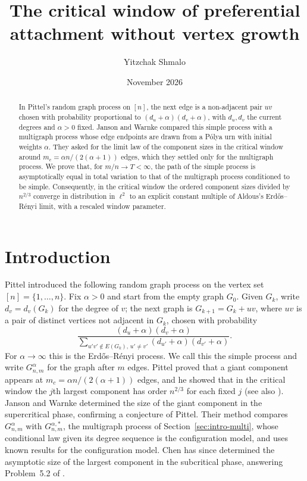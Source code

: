\documentclass[11pt]{amsart}
\title[Preferential attachment without vertex growth]{The critical window of preferential attachment without vertex growth}
\author{Yitzchak Shmalo}
\date{November 2026}
\theoremstyle{remark}
\numberwithin{equation}{section}
\begin{document}
\begin{abstract}
In Pittel's random graph process on $[n]$, the next edge is a non-adjacent pair $uv$ chosen with probability proportional to $(d_u+\alpha)(d_v+\alpha)$, with $d_u,d_v$ the current degrees and $\alpha>0$ fixed. Janson and Warnke compared this simple process with a multigraph process whose edge endpoints are drawn from a P\'olya urn with initial weights $\alpha$. They asked for the limit law of the component sizes in the critical window around $m_c=\alpha n/(2(\alpha+1))$ edges, which they settled only for the multigraph process. We prove that, for $m/n\to T<\infty$, the path of the simple process is asymptotically equal in total variation to that of the multigraph process conditioned to be simple. Consequently, in the critical window the ordered component sizes divided by $n^{2/3}$ converge in distribution in $\ell^2$ to an explicit constant multiple of Aldous's Erd\H{o}s--R\'enyi limit, with a rescaled window parameter.
\end{abstract}
\maketitle

\section{Introduction}\label{sec:intro}

Pittel \cite{Pi10} introduced the following random graph process on the vertex set $[n]=\{1,\dots,n\}$. Fix $\alpha>0$ and start from the empty graph $G_0$. Given $G_k$, write $d_v=d_v(G_k)$ for the degree of $v$; the next graph is $G_{k+1}=G_k+uv$, where $uv$ is a pair of distinct vertices not adjacent in $G_k$, chosen with probability
\begin{equation}\label{eq:simple}
\frac{(d_u+\alpha)(d_v+\alpha)}{\sum_{u'v'\notin E(G_k),\,u'\ne v'}(d_{u'}+\alpha)(d_{v'}+\alpha)}.
\end{equation}
For $\alpha\to\infty$ this is the Erd\H{o}s--R\'enyi process. We call this the simple process and write $G^{\alpha}_{n,m}$ for the graph after $m$ edges. Pittel proved that a giant component appears at $m_c=\alpha n/(2(\alpha+1))$ edges, and he showed that in the critical window the $j$th largest component has order $n^{2/3}$ for each fixed $j$ \cite{Pi10} (see also \cite[Problem~5.3]{JW21}). Janson and Warnke \cite{JW21} determined the size of the giant component in the supercritical phase, confirming a conjecture of Pittel. Their method compares $G^\alpha_{n,m}$ with $G^{\alpha,*}_{n,m}$, the multigraph process of Section~\ref{sec:intro-multi}, whose conditional law given its degree sequence is the configuration model, and uses known results for the configuration model. Chen \cite{Ch26} has since determined the asymptotic size of the largest component in the subcritical phase, answering Problem~5.2 of \cite{JW21}.
\end{document}
